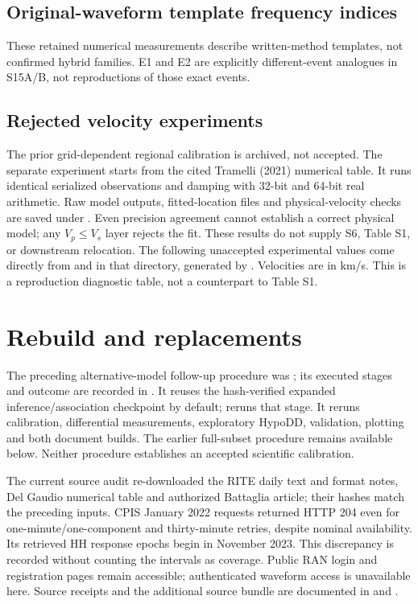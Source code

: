 \subsection*{Original-waveform template frequency indices}
These retained numerical measurements describe written-method templates, not confirmed hybrid families. E1 and E2 are explicitly different-event analogues in S15A/B, not reproductions of those exact events.

\subsection*{Rejected velocity experiments}
The prior grid-dependent regional calibration is archived, not accepted. The separate  experiment starts from the cited Tramelli (2021) numerical table. It runs identical serialized observations and damping with 32-bit and 64-bit real arithmetic. Raw model outputs, fitted-location files and physical-velocity checks are saved under . Even precision agreement cannot establish a correct physical model; any $V_p\leq V_s$ layer rejects the fit. These results do not supply S6, Table S1, or downstream relocation.
The following unaccepted experimental values come directly from  and  in that directory, generated by . Velocities are in km/s. This is a reproduction diagnostic table, not a counterpart to Table S1.


\section{Rebuild and replacements}
The preceding alternative-model follow-up procedure was ; its executed stages and outcome are recorded in . It reuses the hash-verified expanded inference/association checkpoint by default;  reruns that stage. It reruns calibration, differential measurements, exploratory HypoDD, validation, plotting and both document builds. The earlier full-subset procedure remains available below. Neither procedure establishes an accepted scientific calibration.

The current source audit re-downloaded the RITE daily text and format notes, Del Gaudio numerical table and authorized Battaglia article; their hashes match the preceding inputs. CPIS January 2022 requests returned HTTP 204 even for one-minute/one-component and thirty-minute retries, despite nominal availability. Its retrieved HH response epochs begin in November 2023. This discrepancy is recorded without counting the intervals as coverage. Public RAN login and registration pages remain accessible; authenticated waveform access is unavailable here. Source receipts and the additional source bundle are documented in  and .

